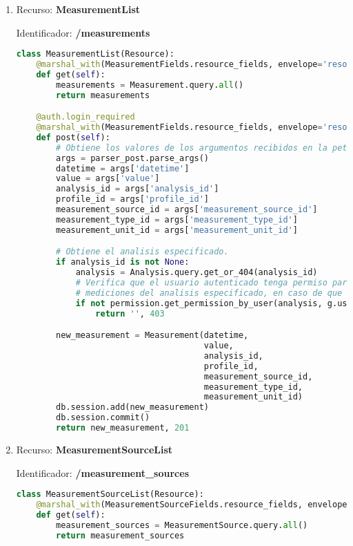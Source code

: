 \begin{enumerate}
\item Recurso: \textbf{MeasurementList}

Identificador: \textbf{/measurements}

\begin{lstlisting}[language=Python]
class MeasurementList(Resource):
    @marshal_with(MeasurementFields.resource_fields, envelope='resource')
    def get(self):
        measurements = Measurement.query.all()
        return measurements

    @auth.login_required
    @marshal_with(MeasurementFields.resource_fields, envelope='resource')
    def post(self):
        # Obtiene los valores de los argumentos recibidos en la peticion.
        args = parser_post.parse_args()
        datetime = args['datetime']
        value = args['value']
        analysis_id = args['analysis_id']
        profile_id = args['profile_id']
        measurement_source_id = args['measurement_source_id']
        measurement_type_id = args['measurement_type_id']
        measurement_unit_id = args['measurement_unit_id']

        # Obtiene el analisis especificado.
        if analysis_id is not None:
            analysis = Analysis.query.get_or_404(analysis_id)
            # Verifica que el usuario autenticado tenga permiso para editar las
            # mediciones del analisis especificado, en caso de que exista.
            if not permission.get_permission_by_user(analysis, g.user, 'edit_measurements'):
                return '', 403

        new_measurement = Measurement(datetime,
                                      value,
                                      analysis_id,
                                      profile_id,
                                      measurement_source_id,
                                      measurement_type_id,
                                      measurement_unit_id)
        db.session.add(new_measurement)
        db.session.commit()
        return new_measurement, 201
\end{lstlisting}

\item 	Recurso: \textbf{MeasurementSourceList}

Identificador: \textbf{/measurement\_sources}

\begin{lstlisting}[language=Python]
class MeasurementSourceList(Resource):
    @marshal_with(MeasurementSourceFields.resource_fields, envelope='resource')
    def get(self):
        measurement_sources = MeasurementSource.query.all()
        return measurement_sources


\end{lstlisting}
\end{enumerate}
